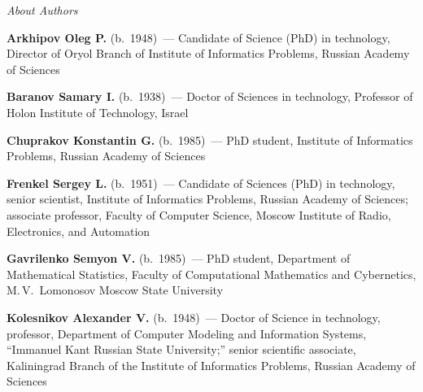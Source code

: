 \begin{center}\LARGE
\textit{About Authors}
\end{center}
\thispagestyle{empty}

\vspace*{48pt}

\begin{multicols}{2}



\noindent
\textbf{Arkhipov Oleg P.} (b.\ 1948)~--- Candidate of Science (PhD) in technology, Director of Oryol Branch of 
 Institute of Informatics Problems,  Russian Academy of Sciences

\vspace*{2pt}


\noindent
\textbf{Baranov Samary I.} (b.\ 1938)~--- Doctor of Sciences in technology, 
Professor of Holon Institute of Technology, Israel


\vspace*{2pt}

\noindent
\textbf{Chuprakov Konstantin G.} (b.\ 1985)~--- PhD student, 
Institute of Informatics Problems, Russian Academy of Sciences

\vspace*{2pt}

\noindent
\textbf{Frenkel Sergey L.} (b.\ 1951)~--- Candidate of Sciences (PhD) in technology, senior scientist, 
Institute of Informatics Problems, Russian Academy of Sciences; associate professor, Faculty of Computer Science, 
Moscow Institute of Radio, Electronics, and Automation

\vspace*{2pt}

\noindent
\textbf{Gavrilenko Semyon V.}  (b.\ 1985)~--- PhD student, 
Department of Mathematical Statistics, 
Faculty of Computational Mathematics and Cybernetics, M.\,V.~Lomonosov Moscow State University

\vspace*{2pt}

\noindent
\textbf{Kolesnikov Alexander V.} (b.\ 1948)~--- 
Doctor of Science in technology,
professor, Department of Computer Modeling and Information Systems,
``Immanuel Kant Russian State University;'' senior scientific associate,
Kaliningrad Branch of the Institute of Informatics Problems, Russian Academy
of Sciences

\vspace*{2pt}


\end{multicols}
